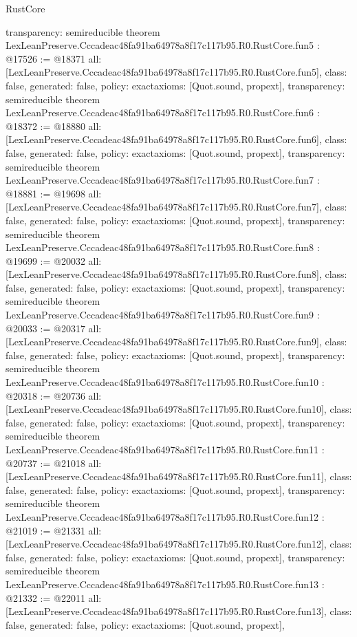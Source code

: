 \begin{lexlean}{RustCore}
\begin{coremodule}
{  transparency: semireducible
}
theorem LexLeanPreserve.Cccadeac48fa91ba64978a8f17c117b95.R0.RustCore.fun5 : @17526 := @18371 {
  all: [LexLeanPreserve.Cccadeac48fa91ba64978a8f17c117b95.R0.RustCore.fun5],
  class: false,
  generated: false,
  policy: exact{axioms: [Quot.sound, propext]},
  transparency: semireducible
}
theorem LexLeanPreserve.Cccadeac48fa91ba64978a8f17c117b95.R0.RustCore.fun6 : @18372 := @18880 {
  all: [LexLeanPreserve.Cccadeac48fa91ba64978a8f17c117b95.R0.RustCore.fun6],
  class: false,
  generated: false,
  policy: exact{axioms: [Quot.sound, propext]},
  transparency: semireducible
}
theorem LexLeanPreserve.Cccadeac48fa91ba64978a8f17c117b95.R0.RustCore.fun7 : @18881 := @19698 {
  all: [LexLeanPreserve.Cccadeac48fa91ba64978a8f17c117b95.R0.RustCore.fun7],
  class: false,
  generated: false,
  policy: exact{axioms: [Quot.sound, propext]},
  transparency: semireducible
}
theorem LexLeanPreserve.Cccadeac48fa91ba64978a8f17c117b95.R0.RustCore.fun8 : @19699 := @20032 {
  all: [LexLeanPreserve.Cccadeac48fa91ba64978a8f17c117b95.R0.RustCore.fun8],
  class: false,
  generated: false,
  policy: exact{axioms: [Quot.sound, propext]},
  transparency: semireducible
}
theorem LexLeanPreserve.Cccadeac48fa91ba64978a8f17c117b95.R0.RustCore.fun9 : @20033 := @20317 {
  all: [LexLeanPreserve.Cccadeac48fa91ba64978a8f17c117b95.R0.RustCore.fun9],
  class: false,
  generated: false,
  policy: exact{axioms: [Quot.sound, propext]},
  transparency: semireducible
}
theorem LexLeanPreserve.Cccadeac48fa91ba64978a8f17c117b95.R0.RustCore.fun10 : @20318 := @20736 {
  all: [LexLeanPreserve.Cccadeac48fa91ba64978a8f17c117b95.R0.RustCore.fun10],
  class: false,
  generated: false,
  policy: exact{axioms: [Quot.sound, propext]},
  transparency: semireducible
}
theorem LexLeanPreserve.Cccadeac48fa91ba64978a8f17c117b95.R0.RustCore.fun11 : @20737 := @21018 {
  all: [LexLeanPreserve.Cccadeac48fa91ba64978a8f17c117b95.R0.RustCore.fun11],
  class: false,
  generated: false,
  policy: exact{axioms: [Quot.sound, propext]},
  transparency: semireducible
}
theorem LexLeanPreserve.Cccadeac48fa91ba64978a8f17c117b95.R0.RustCore.fun12 : @21019 := @21331 {
  all: [LexLeanPreserve.Cccadeac48fa91ba64978a8f17c117b95.R0.RustCore.fun12],
  class: false,
  generated: false,
  policy: exact{axioms: [Quot.sound, propext]},
  transparency: semireducible
}
theorem LexLeanPreserve.Cccadeac48fa91ba64978a8f17c117b95.R0.RustCore.fun13 : @21332 := @22011 {
  all: [LexLeanPreserve.Cccadeac48fa91ba64978a8f17c117b95.R0.RustCore.fun13],
  class: false,
  generated: false,
  policy: exact{axioms: [Quot.sound, propext]},
}
\end{coremodule}
\end{lexlean}
